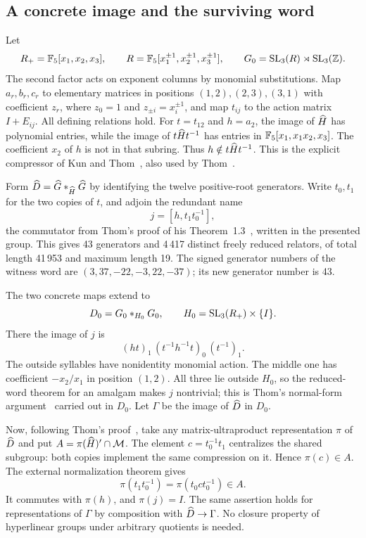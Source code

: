 \documentclass[11pt]{article}
\begin{document}
\subsection{A concrete image and the surviving word}
Let
\[
 R_+=\mathbb F_5[x_1,x_2,x_3],\qquad
 R=\mathbb F_5[x_1^{\pm1},x_2^{\pm1},x_3^{\pm1}],\qquad
 G_0=\operatorname{SL}_3(R)\rtimes\operatorname{SL}_3(\mathbb Z).
\]
The second factor acts on exponent columns by monomial substitutions. Map $a_r,b_r,c_r$
to elementary matrices in positions $(1,2),(2,3),(3,1)$ with coefficient $z_r$, where
$z_0=1$ and $z_{\pm i}=x_i^{\pm1}$, and map $t_{ij}$ to the action matrix $I+E_{ij}$.
All defining relations hold. For $t=t_{12}$ and $h=a_2$, the image of $\widehat H$ has
polynomial entries, while the image of $t\widehat H t^{-1}$ has entries in
$\mathbb F_5[x_1,x_1x_2,x_3]$. The coefficient $x_2$ of $h$ is not in that subring. Thus
$h\notin t\widehat H t^{-1}$. This is the explicit compressor of Kun and Thom~\cite[proof of
Theorem~E]{kt}, also used by Thom~\cite[Section~5.2]{thom}.

Form $\widehat D=\widehat G*_{\widehat H}\widehat G$ by identifying the twelve positive-root generators.
Write $t_0,t_1$ for the two copies of $t$, and adjoin the redundant name
\begin{equation}
 j=[h,t_1t_0^{-1}],\label{eq:witness}
\end{equation}
the commutator from Thom's proof of his Theorem~1.3~\cite[Section~5.2]{thom}, written in
the presented group.
This gives 43 generators and 4\,417 distinct freely reduced relators, of total length
41\,953 and maximum length 19. The signed generator numbers of the witness word are
$(3,37,-22,-3,22,-37)$; its new generator number is 43.

The two concrete maps extend to
\[
 D_0=G_0*_{H_0}G_0,\qquad H_0=\operatorname{SL}_3(R_+)\times\{I\}.
\]
There the image of $j$ is
\begin{equation}
 (ht)_1\,(t^{-1}h^{-1}t)_0\,(t^{-1})_1.\label{eq:normal-word}
\end{equation}
The outside syllables have nonidentity monomial action. The middle one has coefficient
$-x_2/x_1$ in position $(1,2)$. All three lie outside $H_0$, so the reduced-word theorem
for an amalgam makes $j$ nontrivial; this is Thom's normal-form argument~\cite[Section~5.2]{thom}
carried out in $D_0$. Let $\Gamma$ be the image of $\widehat D$ in $D_0$.

Now, following Thom's proof~\cite[Section~5.2]{thom}, take any matrix-ultraproduct
representation $\pi$ of $\widehat D$ and put
$A=\pi(\widehat H)'\cap\mathcal M$. The element $c=t_0^{-1}t_1$ centralizes the shared subgroup:
both copies implement the same compression on it. Hence $\pi(c)\in A$. The external
normalization theorem gives
\[
 \pi(t_1t_0^{-1})=\pi(t_0ct_0^{-1})\in A.
\]
It commutes with $\pi(h)$, and $\pi(j)=I$. The same assertion holds for representations
of $\Gamma$ by composition with $\widehat D\to\Gamma$. No closure property of hyperlinear
groups under arbitrary quotients is needed.
\end{document}
